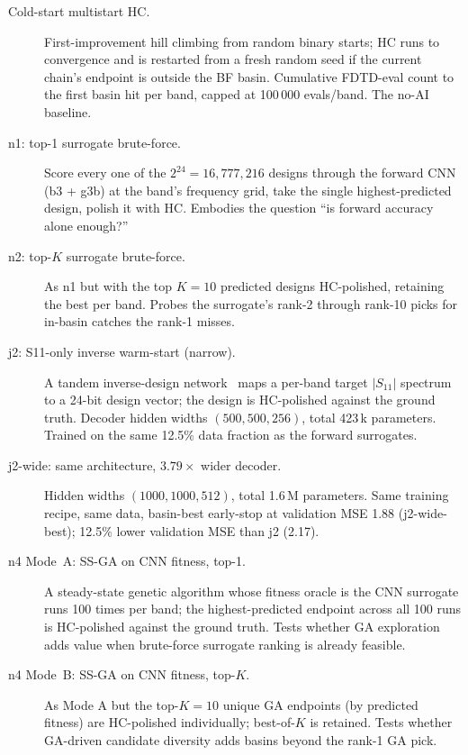 \begin{description}
\item[Cold-start multistart HC.] First-improvement hill climbing from
random binary starts; HC runs to convergence and is restarted from a
fresh random seed if the current chain's endpoint is outside the BF
basin. Cumulative FDTD-eval count to the first basin hit per band,
capped at 100\,000 evals/band. The no-AI baseline.

\item[n1: top-1 surrogate brute-force.] Score every one of the
$2^{24}=16{,}777{,}216$ designs through the forward CNN
(b3 + g3b) at the band's frequency grid, take the single
highest-predicted design, polish it with HC. Embodies the question
``is forward accuracy alone enough?''

\item[n2: top-$K$ surrogate brute-force.] As n1 but with the top
$K{=}10$ predicted designs HC-polished, retaining the best per band.
Probes the surrogate's rank-2 through rank-10 picks for in-basin
catches the rank-1 misses.

\item[j2: S11-only inverse warm-start (narrow).] A tandem inverse-design
network~\cite{Liu2018Tandem} maps a per-band target $|S_{11}|$
spectrum to a 24-bit design vector; the design is HC-polished against
the ground truth. Decoder hidden widths
$(500, 500, 256)$, total 423\,k parameters. Trained on the same
12.5\% data fraction as the forward surrogates.

\item[j2-wide: same architecture, $3.79\times$ wider decoder.] Hidden
widths $(1000, 1000, 512)$, total 1.6\,M parameters. Same training
recipe, same data, basin-best early-stop at validation MSE 1.88
(j2-wide-best); 12.5\% lower validation MSE than j2 (2.17).

\item[n4 Mode~A: SS-GA on CNN fitness, top-1.] A steady-state genetic
algorithm whose fitness oracle is the CNN surrogate runs 100 times
per band; the highest-predicted endpoint across all 100 runs is
HC-polished against the ground truth. Tests whether GA exploration
adds value when brute-force surrogate ranking is already feasible.

\item[n4 Mode~B: SS-GA on CNN fitness, top-$K$.] As Mode A but the
top-$K{=}10$ unique GA endpoints (by predicted fitness) are
HC-polished individually; best-of-$K$ is retained. Tests whether
GA-driven candidate diversity adds basins beyond the rank-1 GA pick.
\end{description}

